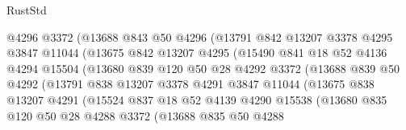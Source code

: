 \begin{lexlean}{RustStd}
\begin{coremodule}
                        @4296
                        @3372
                        (@13688
                          @843
                          @50
                          @4296
                          (@13791
                            @842
                            @13207
                            @3378
                            @4295
                            @3847
                            @11044
                            (@13675
                              @842
                              @13207
                              @4295
                              (@15490
                                @841
                                @18
                                @52
                                @4136
                                @4294
                                @15504
                                (@13680
                                  @839
                                  @120
                                  @50
                                  @28
                                  @4292
                                  @3372
                                  (@13688
                                    @839
                                    @50
                                    @4292
                                    (@13791
                                      @838
                                      @13207
                                      @3378
                                      @4291
                                      @3847
                                      @11044
                                      (@13675
                                        @838
                                        @13207
                                        @4291
                                        (@15524
                                          @837
                                          @18
                                          @52
                                          @4139
                                          @4290
                                          @15538
                                          (@13680
                                            @835
                                            @120
                                            @50
                                            @28
                                            @4288
                                            @3372
                                            (@13688
                                              @835
                                              @50
                                              @4288

\end{coremodule}
\end{lexlean}

